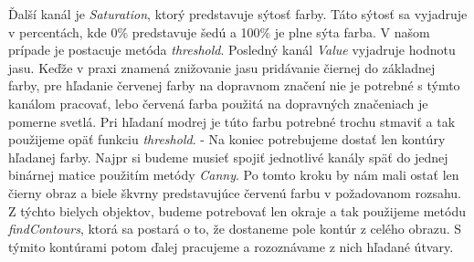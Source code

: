 \documentclass[12pt]{article}
\begin{document}
Ďalší kanál je \emph{Saturation}, ktorý predstavuje sýtosť farby. Táto sýtosť sa vyjadruje v percentách, kde 0\% predstavuje šedú a 100\% je plne sýta farba.\cite{hsv_wiki_cz} 
V našom prípade je postacuje metóda \emph{threshold}. Posledný kanál \emph{Value} vyjadruje hodnotu jasu.
Keďže v praxi znamená znižovanie jasu pridávanie čiernej do základnej farby,
pre hľadanie červenej farby na dopravnom značení nie je potrebné s týmto kanálom pracovať, lebo červená farba použitá na dopravných značeniach je pomerne svetlá.
Pri hľadaní modrej je túto farbu potrebné trochu stmaviť a tak použijeme opäť funkciu \emph{threshold}.
\linebreak
\linebreak
- Na koniec potrebujeme dostať len kontúry hľadanej farby. 
Najpr si budeme musieť spojiť jednotlivé kanály späť do jednej binárnej matice použitím metódy \emph{Canny}. 
Po tomto kroku by nám mali ostať len čierny obraz a biele škvrny predstavujúce červenú farbu v požadovanom rozsahu.
Z týchto bielych objektov, budeme potrebovať len okraje a tak použijeme metódu \emph{findContours}, ktorá sa postará o to, že dostaneme pole kontúr z celého obrazu.
S týmito kontúrami potom ďalej pracujeme a rozoznávame z nich hľadané útvary.
\end{document}
